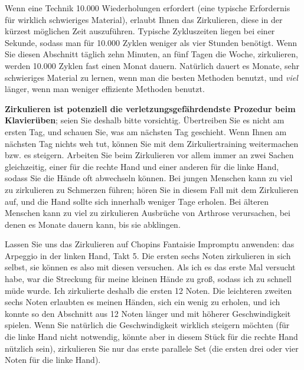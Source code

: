 Wenn eine Technik 10.000 Wiederholungen erfordert (eine typische Erfordernis für wirklich schwieriges Material), erlaubt Ihnen das Zirkulieren, diese in der kürzest möglichen Zeit auszuführen.
Typische Zykluszeiten liegen bei einer Sekunde, sodass man für 10.000 Zyklen weniger als vier Stunden benötigt.
Wenn Sie diesen Abschnitt täglich zehn Minuten, an fünf Tagen die Woche, zirkulieren, werden 10.000 Zyklen fast einen Monat dauern.
Natürlich dauert es Monate, sehr schwieriges Material zu lernen, wenn man die besten Methoden benutzt, und \textit{viel} länger, wenn man weniger effiziente Methoden benutzt.

\textbf{Zirkulieren ist potenziell die verletzungsgefährdendste Prozedur beim Klavierüben}; seien Sie deshalb bitte vorsichtig.
Übertreiben Sie es nicht am ersten Tag, und schauen Sie, was am nächsten Tag geschieht.
Wenn Ihnen am nächsten Tag nichts weh tut, können Sie mit dem Zirkuliertraining weitermachen bzw. es steigern.
Arbeiten Sie beim Zirkulieren vor allem immer an zwei Sachen gleichzeitig, einer für die rechte Hand und einer anderen für die linke Hand, sodass Sie die Hände oft abwechseln können.
Bei jungen Menschen kann zu viel zu zirkulieren zu Schmerzen führen; hören Sie in diesem Fall mit dem Zirkulieren auf, und die Hand sollte sich innerhalb weniger Tage erholen.
Bei älteren Menschen kann zu viel zu zirkulieren Ausbrüche von Arthrose verursachen, bei denen es Monate dauern kann, bis sie abklingen.
 

\label{c1iii2fi}

Lassen Sie uns das Zirkulieren auf Chopins Fantaisie Impromptu anwenden: das Arpeggio in der linken Hand, Takt 5.
Die ersten sechs Noten zirkulieren in sich selbst, sie können es also mit diesen versuchen.
Als ich es das erste Mal versucht habe, war die Streckung für meine kleinen Hände zu groß, sodass ich zu schnell müde wurde.
Ich zirkulierte deshalb die ersten 12 Noten.
Die leichteren zweiten sechs Noten erlaubten es meinen Händen, sich ein wenig zu erholen, und ich konnte so den Abschnitt aus 12 Noten länger und mit höherer Geschwindigkeit spielen.
Wenn Sie natürlich die Geschwindigkeit wirklich steigern möchten (für die linke Hand nicht notwendig, könnte aber in diesem Stück für die rechte Hand nützlich sein), zirkulieren Sie nur das erste parallele Set (die ersten drei oder vier Noten für die linke Hand).

